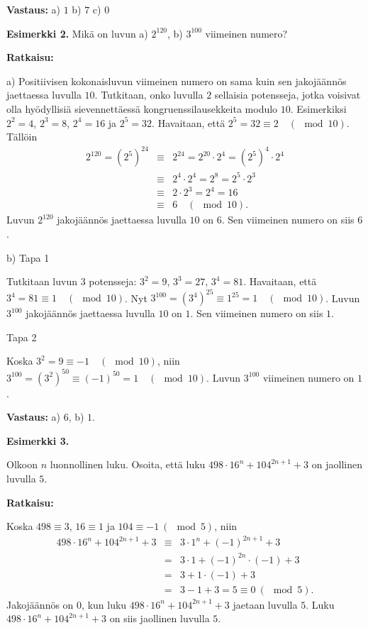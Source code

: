 {\bf Vastaus:} a) $1$ b) $7$ c) $0$



{\bf Esimerkki 2.}
Mikä on luvun a) $2^{120}$, b) $3^{100}$ viimeinen numero?

{\bf Ratkaisu:}

a) Positiivisen kokonaisluvun viimeinen numero on sama kuin sen jakojäännös jaettaessa luvulla $10$.
Tutkitaan, onko luvulla $2$ sellaisia potensseja, jotka voisivat olla hyödyllisiä
sievennettäessä kongruenssilausekkeita modulo $10$. Esimerkiksi $2^2 = 4$, $2^3 = 8$, $2^4 = 16$ ja $2^5 = 32$.
Havaitaan, että $2^5 = 32 \equiv 2 \quad (\mod 10)$. Tällöin
\begin{eqnarray*}
2^{120} = (2^5)^{24} &\equiv& 2^{24} = 2^{20} \cdot 2^4 = (2^5)^4 \cdot 2^4%
\\
&\equiv& 2^4 \cdot 2^4 = 2^8 = 2^5 \cdot 2^3%
\\
&\equiv& 2 \cdot 2^3 = 2^4 = 16%
\\
&\equiv& 6 \quad (\mod 10).
\end{eqnarray*}
Luvun $2^{120}$ jakojäännös
jaettaessa luvulla $10$ on $6$. Sen viimeinen numero on siis $6$.

b) Tapa 1

Tutkitaan luvun $3$ potensseja: $3^2 = 9$, $3^3 = 27$, $3^4 = 81$. Havaitaan, että
$3^4 = 81 \equiv 1 \quad(\mod 10)$. Nyt $3^{100} = (3^4)^{25} \equiv 1^{25}=1 \quad (\mod 10)$. Luvun $3^{100}$ jakojäännös jaettaessa luvulla $10$ on $1$. Sen viimeinen numero on siis $1$.

Tapa 2

Koska $3^2 = 9 \equiv -1 \quad(\mod 10)$, niin $3^{100} = (3^2)^{50} \equiv (-1)^{50} = 1 \quad (\mod 10)$. Luvun $3^{100}$ viimeinen numero on $1$.

{\bf Vastaus:} a) $6$, b) $1$.


{\bf Esimerkki 3.}

Olkoon $n$ luonnollinen luku. Osoita, että luku $498 \cdot 16^{n} + 104^{2n+1} + 3$ on jaollinen luvulla $5$.

{\bf Ratkaisu:}

Koska $498 \equiv 3$, $16 \equiv 1$ ja $104 \equiv -1 \ (\mod 5)$, niin
\begin{eqnarray*}
498 \cdot 16^{n} + 104^{2n+1} + 3 & \equiv & 3 \cdot 1^{n} + (-1)^{2n+1} + 3 \\
 & = & 3 \cdot 1 + (-1)^{2n} \cdot (-1) + 3 \\
 & = & 3 + 1 \cdot (-1) + 3 \\
 & = & 3 - 1 + 3 = 5 \equiv 0 \ (\mod 5).
\end{eqnarray*}
Jakojäännös on $0$, kun luku $498 \cdot 16^{n} + 104^{2n+1} + 3$ jaetaan luvulla $5$. Luku $498 \cdot 16^{n} + 104^{2n+1} + 3$ on siis jaollinen luvulla $5$.


